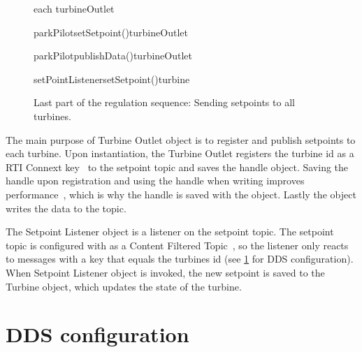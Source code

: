 \begin{figure}[!h]
	\centering
	\begin{sequencediagram} %
	
		\begin{sdblock}{each turbineOutlet}{}
			\begin {call}{parkPilot}{setSetpoint()}{turbineOutlet}{}
			\end {call}
			\begin {call}{parkPilot}{publishData()}{turbineOutlet}{}
				\begin {call}{setPointListener}{setSetpoint()}{turbine}{}
				\end {call}
			\end {call}
		\end{sdblock}				
	\end{sequencediagram}

	\caption[Last part of the regulation cycle]{
		\label{fig:sendSetpoints} 
		\footnotesize{%
			Last part of the regulation sequence: Sending setpoints to all turbines.
		}
	}
\end{figure}

The main purpose of Turbine Outlet object is to register and publish setpoints to each turbine. Upon instantiation, the Turbine Outlet registers the turbine id as a RTI Connext key~\cite{rtiConnextUsersManual} to the setpoint topic and saves the handle object. Saving the handle upon registration and using the handle when writing improves performance~\cite{DDSInstanceHandlet}, which is why the handle is saved with the object. Lastly the object writes the data to the topic.

The Setpoint Listener object is a listener on the setpoint topic. The setpoint topic is configured with as a Content Filtered Topic~\cite{rtiConnextUsersManual}, so the listener only reacts to messages with a key that equals the turbines id (see \cref{sec:ddsConfigCen} for DDS configuration). When Setpoint Listener object is invoked, the new setpoint is saved to the Turbine object, which updates the state of the turbine.

\section{DDS configuration}\label{sec:ddsConfigCen} 


